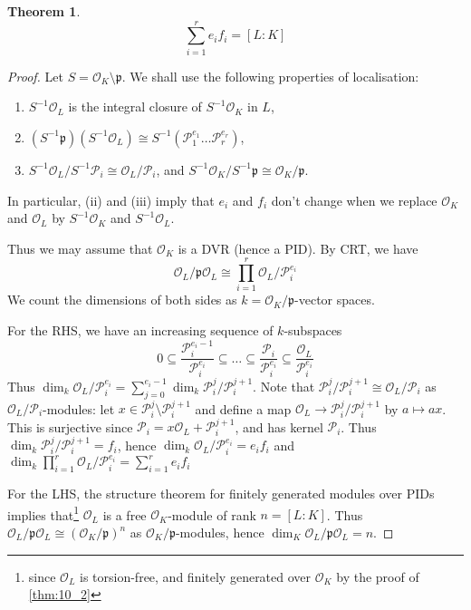 \documentclass[11pt]{article}
\theoremstyle{definition}
\theoremstyle{plain}
\newtheorem{theorem}[definition]{Theorem}
\theoremstyle{remark}
\newcommand{\cO}{\mathcal{O}}
\newcommand{\cP}{\mathcal{P}}
\newcommand{\fp}{\mathfrak{p}}
\begin{document}
\begin{theorem}\label{thm:11_3}
    \begin{equation*}
        \sum_{i=1}^r e_i f_i = [L : K]
    \end{equation*}
\end{theorem}
\begin{proof}
    Let $S = \cO_K \setminus \fp$. We shall use the following properties of localisation:
    \begin{enumerate}
        \item $S^{-1} \cO_L$ is the integral closure of $S^{-1} \cO_K$ in $L$,
        \item $(S^{-1} \fp) (S^{-1} \cO_L) \cong S^{-1}(\cP_1^{e_1} \ldots \cP_r^{e_r})$,
        \item $S^{-1} \cO_L / S^{-1} \cP_i \cong \cO_L / \cP_i$, and $S^{-1} \cO_K / S^{-1} \fp \cong \cO_K / \fp$.
    \end{enumerate}
    In particular, (ii) and (iii) imply that $e_i$ and $f_i$ don't change when we replace $\cO_K$ and $\cO_L$ by $S^{-1}\cO_K$ and $S^{-1} \cO_L$.

    Thus we may assume that $\cO_K$ is a DVR (hence a PID). By CRT, we have
    \begin{equation*}
        \cO_L / \fp \cO_L \cong \prod_{i=1}^r \cO_L / \cP_i^{e_i}
    \end{equation*}
    We count the dimensions of both sides as $k = \cO_K / \fp$-vector spaces.

    For the RHS, we have an increasing sequence of $k$-subspaces
    \begin{equation*}
        0 \subseteq \frac{\cP_i^{e_i - 1}}{\cP_i^{e_i}} \subseteq \ldots \subseteq \frac{\cP_i}{\cP_i^{e_i}} \subseteq \frac{\cO_L}{\cP_i^{e_i}}
    \end{equation*}
    Thus $\dim_k \cO_L / \cP_i^{e_i} = \sum_{j=0}^{e_i - 1} \dim_k \cP_i^{j} / \cP_i^{j+1}$. Note that $\cP_i^{j} / \cP_i^{j+1} \cong \cO_L / \cP_i$ as $\cO_L / \cP_i$-modules: let $x \in \cP_i^j \setminus \cP_i^{j+1}$ and define a map $\cO_L \to \cP_i^j / \cP_i^{j+1}$ by $a \mapsto a x$. This is surjective since $\cP_i = x \cO_L + \cP_i^{j+1}$, and has kernel $\cP_i$. Thus $\dim_k \cP_i^j / \cP_i^{j+1} = f_i$, hence $\dim_k \cO_L / \cP_i^{e_i} = e_i f_i$ and $\dim_k \prod_{i=1}^r \cO_L / \cP_i^{e_i} = \sum_{i=1}^{r} e_i f_i$

    For the LHS, the structure theorem for finitely generated modules over PIDs implies that\footnote{since $\cO_L$ is torsion-free, and finitely generated over $\cO_K$ by the proof of \autoref{thm:10_2}} $\cO_L$ is a free $\cO_K$-module of rank $n = [L : K]$. Thus $\cO_L / \fp \cO_L \cong (\cO_K / \fp)^n$ as $\cO_K / \fp$-modules, hence $\dim_K \cO_L / \fp \cO_L = n$.
\end{proof}
\end{document}
